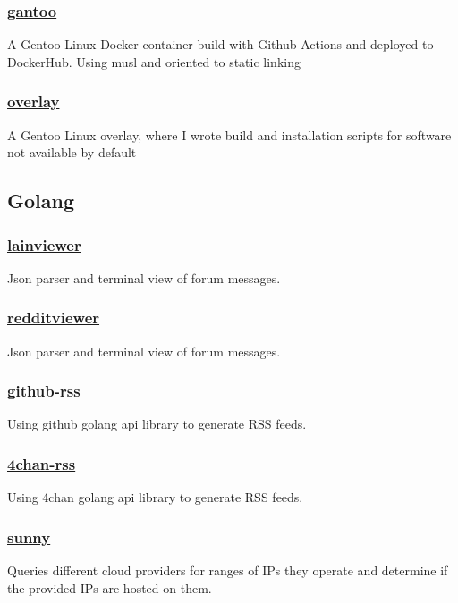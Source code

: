 \documentclass[11pt]{article}
\begin{document}
\subsubsection{\href {https://github.com/azimut/gantoo} {gantoo}}
A Gentoo Linux Docker container build with Github Actions and deployed to DockerHub. Using musl and oriented to static linking
\subsubsection{\href {https://github.com/azimut/overlay} {overlay}}
A Gentoo Linux overlay, where I wrote build and installation scripts for software not available by default

\subsection{Golang}
\subsubsection{\href {https://github.com/azimut/lainviewer} {lainviewer}}
Json parser and terminal view of forum messages.
\subsubsection{\href {https://github.com/azimut/redditviewer} {redditviewer}}
Json parser and terminal view of forum messages.
\subsubsection{\href {https://github.com/azimut/github-rss} {github-rss}}
Using github golang api library to generate RSS feeds.
\subsubsection{\href {https://github.com/azimut/4chan-rss} {4chan-rss}}
Using 4chan golang api library to generate RSS feeds.
\subsubsection{\href {https://github.com/azimut/sunny} {sunny}}
Queries different cloud providers for ranges of IPs they operate and determine if the provided IPs are hosted on them.
\end{document}

